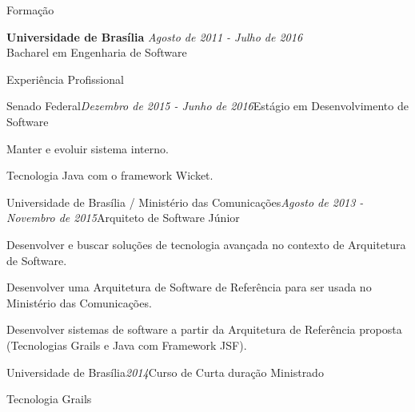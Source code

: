 \documentclass{resume} %
\begin{document}





\begin{rSection}{Formação}

{\bf Universidade de Brasília} \hfill {\em Agosto de 2011 - Julho de 2016} \\ 
Bacharel em Engenharia de Software \\

\end{rSection}


\begin{rSection}{Experiência Profissional}

\begin{rSubsection}{Senado Federal}{\em Dezembro de 2015 - Junho de 2016}{Estágio em Desenvolvimento de Software}{}
\item Manter e evoluir sistema interno.
\item Tecnologia Java com o framework Wicket.
\end{rSubsection}

\begin{rSubsection}{Universidade de Brasília / Ministério das Comunicações}{\em Agosto de 2013 - Novembro de 2015}{Arquiteto de Software Júnior}{}
\item Desenvolver e buscar soluções de tecnologia avançada no contexto de Arquitetura de
Software.
\item Desenvolver uma Arquitetura de Software de Referência para ser usada no Ministério
das Comunicações.
\item Desenvolver sistemas de software a partir da Arquitetura de Referência proposta (Tecnologias Grails e Java com Framework JSF).
\end{rSubsection}


\begin{rSubsection}{Universidade de Brasília}{\em 2014}{Curso de Curta duração Ministrado}{}
\item Tecnologia Grails
\end{rSubsection}

\end{rSection}
\end{document}

